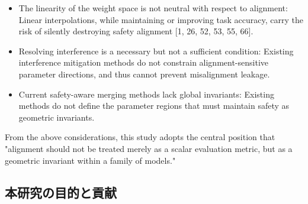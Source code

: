 \documentclass{article}
\begin{document}
\begin{itemize}
\item The linearity of the weight space is not neutral with respect to alignment: Linear interpolations, while maintaining or improving task accuracy, carry the risk of silently destroying safety alignment [1, 26, 52, 53, 55, 66].
\item Resolving interference is a necessary but not a sufficient condition: Existing interference mitigation methods do not constrain alignment-sensitive parameter directions, and thus cannot prevent misalignment leakage.
\item Current safety-aware merging methods lack global invariants: Existing methods do not define the parameter regions that must maintain safety as geometric invariants.
\end{itemize}

From the above considerations, this study adopts the central position that "alignment should not be treated merely as a scalar evaluation metric, but as a geometric invariant within a family of models."

\subsection{本研究の目的と貢献}



\end{document}
